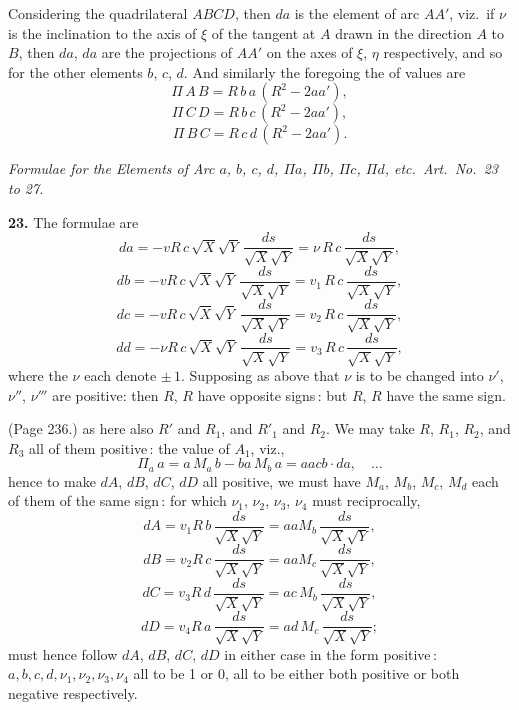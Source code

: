 \documentclass[11pt,a4paper]{article}
\theoremstyle{plain}
\theoremstyle{definition}
\begin{document}
Considering the quadrilateral $ABCD$, then $da$ is the element of arc $A A'$, viz.\ if $\nu$ is the inclination to the axis of $\xi$ of the tangent at $A$ drawn in the direction $A$ to $B$, then $d a$, $d a$ are the projections of $A A'$ on the axes of $\xi$, $\eta$ respectively, and so for the other elements $b$, $c$, $d$. And similarly the foregoing the of values are
\[
\Pi\,A\,B = R\,b\,a\,(R^2 - 2 a a'),
\]
\[
\Pi\,C\,D = R\,b\,c\,(R^2 - 2 a a'),
\]
\[
\Pi\,B\,C = R\,c\,d\,(R^2 - 2 a a').
\]

\medskip

\noindent\textit{Formulae for the Elements of Arc $a$, $b$, $c$, $d$, $\Pi a$, $\Pi b$, $\Pi c$, $\Pi d$, etc.\ Art.\ No.\ 23 to 27.}

\medskip

\noindent\textbf{23.} The formulae are
\[
da = - v R\,c\,\sqrt{X}\sqrt{Y}\,\frac{ds}{\sqrt{X}\sqrt{Y}} = \nu\,R\,c\,\frac{ds}{\sqrt{X}\sqrt{Y}},
\]
\[
db = - v R\,c\,\sqrt{X}\sqrt{Y}\,\frac{ds}{\sqrt{X}\sqrt{Y}} = v_1\,R\,c\,\frac{ds}{\sqrt{X}\sqrt{Y}},
\]
\[
dc = - v R\,c\,\sqrt{X}\sqrt{Y}\,\frac{ds}{\sqrt{X}\sqrt{Y}} = v_2\,R\,c\,\frac{ds}{\sqrt{X}\sqrt{Y}},
\]
\[
dd = - \nu R\,c\,\sqrt{X}\sqrt{Y}\,\frac{ds}{\sqrt{X}\sqrt{Y}} = v_3\,R\,c\,\frac{ds}{\sqrt{X}\sqrt{Y}},
\]
where the $\nu$ each denote $\pm\,1$. Supposing as above that $\nu$ is to be changed into $\nu'$, $\nu''$, $\nu'''$ are positive: then $R$, $R$ have opposite signs\,: but $R$, $R$ have the same sign.

\medskip

\noindent (Page 236.) as here also $R'$ and $R_1$, and $R'_1$ and $R_2$. We may take $R$, $R_1$, $R_2$, and $R_3$ all of them positive\,: the value of $A_1$, viz.,
\[
\Pi_a\,a = a\,M_a\,b - b a\,M_b\,a = a a c b \cdot da, \quad \ldots
\]
hence to make $dA$, $dB$, $dC$, $dD$ all positive, we must have $M_a$, $M_b$, $M_c$, $M_d$ each of them of the same sign\,: for which $\nu_1$, $\nu_2$, $\nu_3$, $\nu_4$ must reciprocally,
\[
d A = v_1 R\,b\,\frac{ds}{\sqrt{X}\sqrt{Y}} = a a M_b\,\frac{ds}{\sqrt{X}\sqrt{Y}},
\]
\[
d B = v_2 R\,c\,\frac{ds}{\sqrt{X}\sqrt{Y}} = a a M_c\,\frac{ds}{\sqrt{X}\sqrt{Y}},
\]
\[
d C = v_3 R\,d\,\frac{ds}{\sqrt{X}\sqrt{Y}} = a c\,M_b\,\frac{ds}{\sqrt{X}\sqrt{Y}},
\]
\[
d D = v_4 R\,a\,\frac{ds}{\sqrt{X}\sqrt{Y}} = a d\,M_c\,\frac{ds}{\sqrt{X}\sqrt{Y}};
\]
must hence follow $dA$, $dB$, $dC$, $dD$ in either case in the form positive\,: $a, b, c, d, \nu_1, \nu_2, \nu_3, \nu_4$ all to be 1 or 0, all to be either both positive or both negative respectively.
\end{document}
